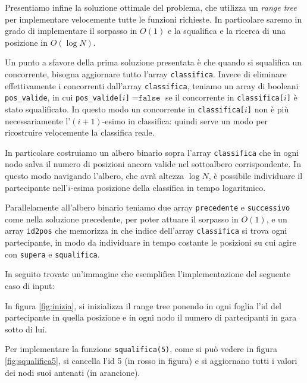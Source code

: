 \RangeTree
Presentiamo infine la soluzione ottimale del problema, che utilizza un \emph{range tree} per implementare velocemente tutte le funzioni richieste. In particolare saremo in grado di implementare il sorpasso in $O(1)$ e la squalifica e la ricerca di una posizione in $O(\log N)$.

Un punto a sfavore della prima soluzione presentata è che quando si squalifica un concorrente, bisogna aggiornare tutto l'array \texttt{classifica}. Invece di eliminare effettivamente i concorrenti dall'array \texttt{classifica}, teniamo un array di booleani \texttt{pos\_valide}, in cui \texttt{pos\_valide[$i$]}$ = \texttt{false}$ se il concorrente in \texttt{classifica[$i$]} è stato squalificato. In questo modo un concorrente in \texttt{classifica[$i$]} non è più necessariamente l'$(i+1)$-esimo in classifica: quindi serve un modo per ricostruire velocemente la classifica reale.

In particolare costruiamo un albero binario sopra l'array \texttt{classifica} che in ogni nodo salva il numero di posizioni ancora valide nel sottoalbero corrispondente.
In questo modo navigando l'albero, che avrà altezza $\log N$, è possibile individuare il partecipante nell'$i$-esima posizione della classifica in tempo logaritmico.

Parallelamente all'albero binario teniamo due array \texttt{precedente} e \texttt{successivo} come nella soluzione precedente, per poter attuare il sorpasso in $O(1)$, e un array \texttt{id2pos} che memorizza in che indice dell'array \texttt{classifica} si trova ogni partecipante, in modo da individuare in tempo costante le posizioni su cui agire con \texttt{supera} e \texttt{squalifica}. 


In seguito trovate un'immagine che esemplifica l'implementazione del seguente caso di input:

\begin{example}
\end{example}

In figura \ref{fig:inizia}, si inizializza il range tree ponendo in ogni foglia l'id del partecipante in quella posizione e in ogni nodo il numero di partecipanti in gara sotto di lui. 

Per implementare la funzione \texttt{squalifica(5)}, come si può vedere in figura \ref{fig:squalifica5}, si cancella l'id 5 (in \color{red}rosso \color{black} in figura) e si aggiornano tutti i valori dei nodi suoi antenati (in \color{orange}arancione\color{black}).

